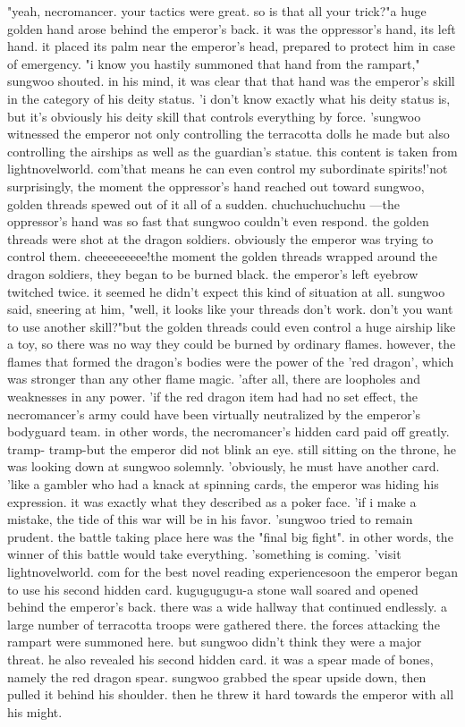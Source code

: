 "yeah, necromancer.
 your tactics were great.
 so is that all your trick?"a huge golden hand arose behind the emperor's back.
 it was the oppressor's hand, its left hand.
 it placed its palm near the emperor's head, prepared to protect him in case of emergency.
"i know you hastily summoned that hand from the rampart," sungwoo shouted.
 in his mind, it was clear that that hand was the emperor's skill in the category of his deity status.
'i don't know exactly what his deity status is, but it's obviously his deity skill that controls everything by force.
'sungwoo witnessed the emperor not only controlling the terracotta dolls he made but also controlling the airships as well as the guardian's statue.
 this content is taken from lightnovelworld.
com'that means he can even control my subordinate spirits!'not surprisingly, the moment the oppressor's hand reached out toward sungwoo, golden threads spewed out of it all of a sudden.
 chuchuchuchuchu —the oppressor's hand was so fast that sungwoo couldn't even respond.
 the golden threads were shot at the dragon soldiers.
 obviously the emperor was trying to control them.
cheeeeeeeee!the moment the golden threads wrapped around the dragon soldiers, they began to be burned black.
 the emperor's left eyebrow twitched twice.
 it seemed he didn't expect this kind of situation at all.
sungwoo said, sneering at him, "well, it looks like your threads don't work.
 don't you want to use another skill?"but the golden threads could even control a huge airship like a toy, so there was no way they could be burned by ordinary flames.
 however, the flames that formed the dragon's bodies were the power of the 'red dragon', which was stronger than any other flame magic.
'after all, there are loopholes and weaknesses in any power.
'if the red dragon item had had no set effect, the necromancer's army could have been virtually neutralized by the emperor's bodyguard team.
 in other words, the necromancer's hidden card paid off greatly.
tramp- tramp-but the emperor did not blink an eye.
 still sitting on the throne, he was looking down at sungwoo solemnly.
 'obviously, he must have another card.
'like a gambler who had a knack at spinning cards, the emperor was hiding his expression.
it was exactly what they described as a poker face.
'if i make a mistake, the tide of this war will be in his favor.
'sungwoo tried to remain prudent.
 the battle taking place here was the "final big fight".
in other words, the winner of this battle would take everything.
'something is coming.
'visit lightnov‌elworld.
com for the best novel reading experiencesoon the emperor began to use his second hidden card.
kugugugugu-a stone wall soared and opened behind the emperor's back.
 there was a wide hallway that continued endlessly.
 a large number of terracotta troops were gathered there.
 the forces attacking the rampart were summoned here.
but sungwoo didn't think they were a major threat.
 he also revealed his second hidden card.
it was a spear made of bones, namely the red dragon spear.
 sungwoo grabbed the spear upside down, then pulled it behind his shoulder.
 then he threw it hard towards the emperor with all his might.


